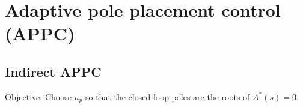 \section{Adaptive pole placement control (APPC)}

\subsection{Indirect APPC}
Objective: Choose $u_p$ so that the closed-loop poles are the roots of $A^*(s) = 0$.